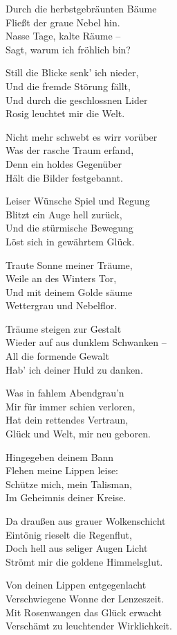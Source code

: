 \begin{liebesgedicht}
Durch die herbstgebräunten Bäume\\
Fließt der graue Nebel hin.\\
Nasse Tage, kalte Räume –\\
Sagt, warum ich fröhlich bin?

Still die Blicke senk' ich nieder,\\
Und die fremde Störung fällt,\\
Und durch die geschlossnen Lider\\
Rosig leuchtet mir die Welt.

Nicht mehr schwebt es wirr vorüber\\ Was der rasche Traum erfand,\\
Denn ein holdes Gegenüber\\ Hält die Bilder festgebannt.

Leiser Wünsche Spiel und Regung\\ Blitzt ein Auge hell zurück,\\
Und die stürmische Bewegung\\ Löst sich in gewährtem Glück.

Traute Sonne meiner Träume,\\ Weile an des Winters Tor,\\ Und mit
deinem Golde säume\\ Wettergrau und Nebelflor.
\end{liebesgedicht}

\begin{liebesgedicht}
Träume steigen zur Gestalt\\
Wieder auf aus dunklem Schwanken –\\
All die formende Gewalt\\
Hab' ich deiner Huld zu danken.

Was in fahlem Abendgrau'n\\
Mir für immer schien verloren,\\
Hat dein rettendes Vertraun,\\
Glück und Welt, mir neu geboren.

Hingegeben deinem Bann\\
Flehen meine Lippen leise:\\
Schütze mich, mein Talisman,\\
Im Geheimnis deiner Kreise.
\end{liebesgedicht}

\begin{liebesgedicht}
Da draußen aus grauer Wolkenschicht\\
Eintönig rieselt die Regenflut,\\
Doch hell aus seliger Augen Licht\\
Strömt mir die goldene Himmelsglut.

Von deinen Lippen entgegenlacht\\
Verschwiegene Wonne der Lenzeszeit.\\
Mit Rosenwangen das Glück erwacht\\
Verschämt zu leuchtender Wirklichkeit.
\end{liebesgedicht}

